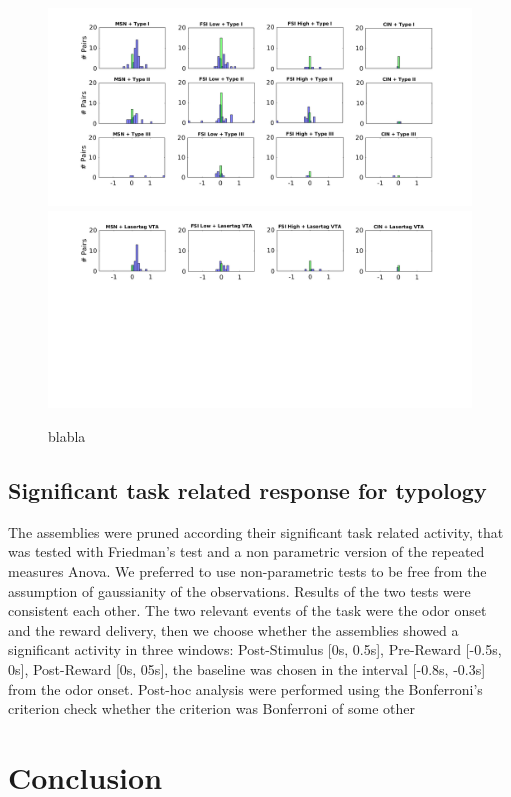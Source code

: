 \begin{figure}[H]
\centering
\includegraphics[scale=0.4]{figures/Type_oriz.png}
\includegraphics[scale=0.4]{figures/OnlyLaserOriz.png}
\caption{blabla}
\label{fig:LagInSecAll}
\end{figure}



\subsection{Significant task related response for typology}
The assemblies were pruned according their significant task related activity, that was tested with Friedman's test and a non parametric version of the repeated measures Anova. We preferred to use non-parametric tests to be free from the assumption of gaussianity of the observations. Results of the two tests were consistent each other. The two relevant events of the task were the odor onset and the reward delivery, then we choose whether the assemblies showed a significant activity in three windows: Post-Stimulus [0s, 0.5s], Pre-Reward [-0.5s, 0s], Post-Reward [0s, 05s], the baseline was chosen in the interval [-0.8s, -0.3s] from the odor onset. Post-hoc analysis were performed using the Bonferroni's criterion {\color{red}check whether the criterion was Bonferroni of some other}
\section{Conclusion}
